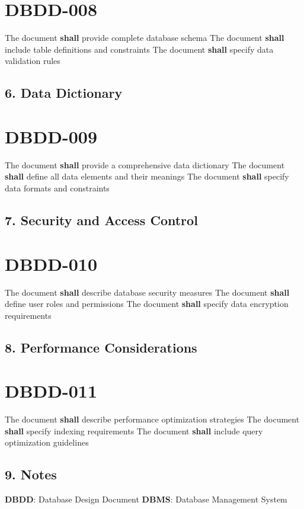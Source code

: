 \section{DBDD-008}\label{DBDD-008}

The document \textbf{shall} provide complete database schema
The document \textbf{shall} include table definitions and constraints
The document \textbf{shall} specify data validation rules

\subsection{6. Data Dictionary}

\section{DBDD-009}\label{DBDD-009}

The document \textbf{shall} provide a comprehensive data dictionary
The document \textbf{shall} define all data elements and their meanings
The document \textbf{shall} specify data formats and constraints

\subsection{7. Security and Access Control}

\section{DBDD-010}\label{DBDD-010}

The document \textbf{shall} describe database security measures
The document \textbf{shall} define user roles and permissions
The document \textbf{shall} specify data encryption requirements

\subsection{8. Performance Considerations}

\section{DBDD-011}\label{DBDD-011}

The document \textbf{shall} describe performance optimization strategies
The document \textbf{shall} specify indexing requirements
The document \textbf{shall} include query optimization guidelines

\subsection{9. Notes}
\textbf{DBDD}: Database Design Document
\textbf{DBMS}: Database Management System

